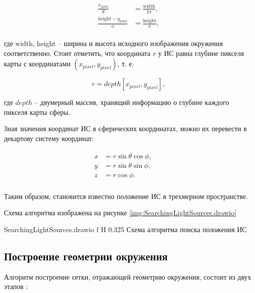 \begin{equation}
	\begin{aligned}
		\begin{split}
			\frac{x_{\text{pixel}}}{\theta} &= \frac{\text{width}}{2\pi}, \\
			\frac{\text{height} - y_{\text{pixel}}}{\phi} &= \frac{\text{height}}{\pi}, 
		\end{split}
	\end{aligned}
\end{equation}

где width, height -- ширина и высота исходного изображения окружения соответственно. Стоит отметить, что координата $r$ у ИС равна глубине пикселя карты с координатами $(x_{pixel}, y_{pixel})$, т. е. 

\begin{equation}
	r = depth[x_{pixel}, y_{pixel}],
\end{equation}
 
где $depth$ -- двумерный массив, хранящий информацию о глубине каждого пикселя карты сферы.

Зная значения координат ИС в сферических координатах, можно их перевести в декартову систему координат:

\begin{equation}
	\begin{aligned}
		\begin{split}
			x &= r \sin\theta \cos\phi, &&\\
			y &= r \sin\theta \sin\phi, &&\\
			z &= r \cos\phi. &&\\
		\end{split}
	\end{aligned}
\end{equation}

Таким образом, становится известно положение ИС в трехмерном пространстве.

Схема алгоритма изображена на рисунке \ref{img:SearchingLightSources.drawio}

{SearchingLightSources.drawio}
{f}
{H}
{0.325\textwidth}
{Схема алгоритма поиска положения ИС}

\subsection{Построение геометрии окружения}

Алгоритм построение сетки, отражающей геометрию окружения, состоит из двух этапов \cite{du2020depthlab}: 

